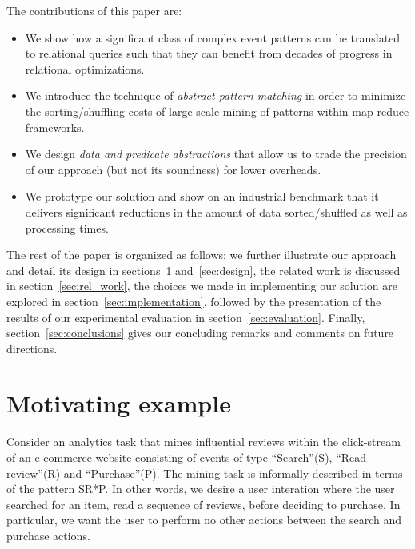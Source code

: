 The contributions of this paper are:
\begin{itemize}
	\item We show how a significant class of complex event patterns can be 
	translated to relational queries such that they can benefit from decades of 
	progress in relational optimizations.
	\item We introduce the technique of {\em abstract pattern matching} in 
	order to minimize the sorting/shuffling costs of large scale mining of 
	patterns within map-reduce frameworks.
	\item We design {\em data and predicate abstractions} that allow us to 
	trade the precision of our approach (but not its soundness) for lower 
	overheads.
	\item We prototype our solution and show on an industrial benchmark that 
	it delivers significant reductions in the amount of data sorted/shuffled as 
	well as processing times.  
\end{itemize}


The rest of the paper is organized as follows: 
we further illustrate our approach and detail its design in 
sections~\ref{sec:mot_example} and~\ref{sec:design},
the related work is discussed in section~\ref{sec:rel_work},  
the choices we made in implementing our solution are explored in 
section~\ref{sec:implementation}, followed by the presentation of the results 
of our experimental evaluation in section~\ref{sec:evaluation}. 
Finally, section~\ref{sec:conclusions} gives our concluding remarks and 
comments on future directions.   









\section{Motivating example}
\label{sec:mot_example}

Consider an analytics task that mines influential reviews
within the click-stream of an e-commerce website consisting of events of type
``Search''(S), ``Read review''(R) and ``Purchase''(P). 
The mining task is informally described in terms of the pattern
SR*P. In other words, we desire a user interation where the user
searched for an item, read a sequence of reviews, before deciding to
purchase. In particular, we want the user to perform no other actions
between the search and purchase actions. 


